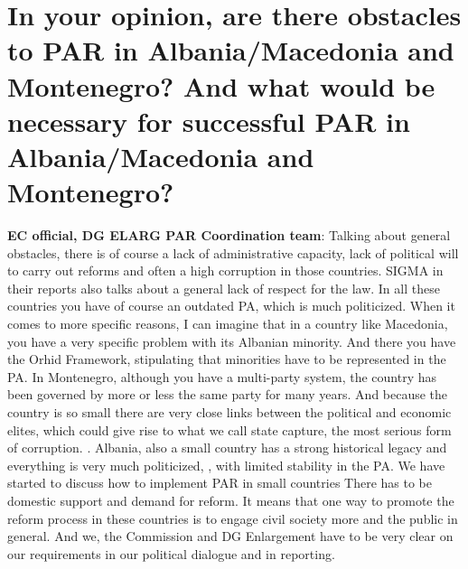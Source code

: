 \section{ In your opinion, are there obstacles to PAR in Albania/Macedonia and Montenegro? And what would be necessary for successful PAR in Albania/Macedonia and Montenegro? }
\textbf{EC official, DG ELARG PAR Coordination team}: Talking about general obstacles, there is of course a lack of administrative capacity, lack of political will to carry out reforms and often a high corruption in those countries. SIGMA in their reports also talks about a general lack of respect for the law. In all these countries you have of course an outdated PA, which is much politicized. When it comes to more specific reasons, I can imagine that in a country like Macedonia, you have a very specific problem with its Albanian minority. And there you have the Orhid Framework, stipulating that minorities have to be represented in the PA. In Montenegro, although you have a multi-party system, the country has been governed by more or less the same party for many years. And because the country is so small there are very close links between the political and economic elites, which could give rise to what we call state capture, the most serious form of corruption. . Albania, also a small country has a strong historical legacy and everything is very much politicized, , with limited stability in the PA. We have started to discuss how to implement PAR in small countries There has to be domestic support and demand for reform. It means that one way to promote the reform process in these countries is to engage civil society more and the public in general. And we, the Commission and DG Enlargement have to be very clear on our requirements in our political dialogue and in reporting. \\
